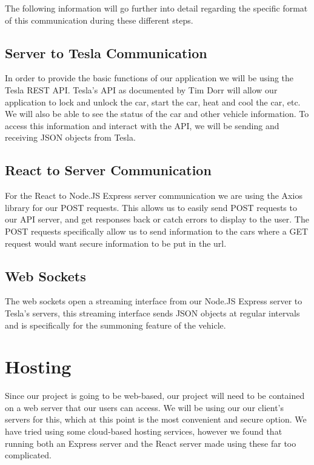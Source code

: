\documentclass[onecolumn, draftclsnofoot,10pt, compsoc]{IEEEtran}
\begin{document}
    The following information will go further into detail regarding the specific format of this communication during these different steps. 
    
    
    \subsection{Server to Tesla Communication}
    In order to provide the basic functions of our application we will be using the Tesla REST API. Tesla's API as documented by Tim Dorr will allow our application to lock and unlock the car, start the car, heat and cool the car, etc. We will also be able to see the status of the car and other vehicle information. To access this information and interact with the API, we will be sending and receiving JSON objects from Tesla. \cite{API}
    \subsection{React to Server Communication}
    For the React to Node.JS Express server communication we are using the Axios library for our POST requests. This allows us to easily send POST requests to our API server, and get responses back or catch errors to display to the user. The POST requests specifically allow us to send information to the cars where a GET request would want secure information to be put in the url. 
    \subsection{Web Sockets}
    The web sockets open a streaming interface from our Node.JS Express server to Tesla's servers, this streaming interface sends JSON objects at regular intervals and is specifically for the summoning feature of the vehicle. 

\section{Hosting}

    Since our project is going to be web-based, our project will need to be contained on a web server that our users can access.
    We will be using our our client's servers for this, which at this point is the most convenient and secure option. We have tried using some cloud-based hosting services, however we found that running both an Express server and the React server made using these far too complicated.



\end{document}
